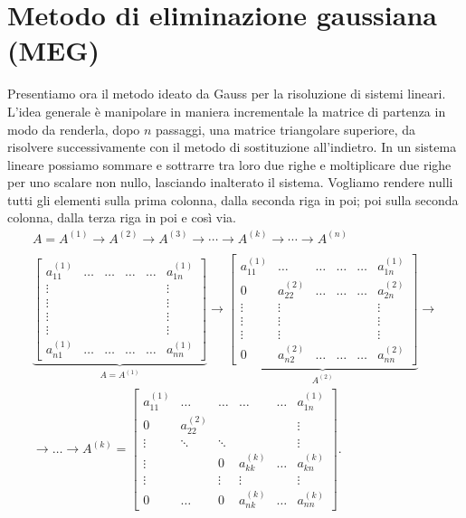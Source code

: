 \section{Metodo di eliminazione gaussiana (MEG)}
Presentiamo ora il metodo ideato da Gauss per la risoluzione di sistemi lineari.
L'idea generale è manipolare in maniera incrementale la matrice di partenza in modo da renderla, dopo $\displaystyle n$ passaggi, una matrice triangolare superiore, da risolvere successivamente con il metodo di sostituzione all'indietro. In un sistema lineare possiamo sommare e sottrarre tra loro due righe e moltiplicare due righe per uno scalare non nullo, lasciando inalterato il sistema. Vogliamo rendere nulli tutti gli elementi sulla prima colonna, dalla seconda riga in poi; poi sulla seconda colonna, dalla terza riga in poi e così via.
\begin{gather*}
A=A^{(1)}\rightarrow A^{(2)}\rightarrow A^{(3)}\rightarrow \cdots \rightarrow A^{(k)}\rightarrow \cdots \rightarrow A^{(n)}\\
\\
\underbrace{\begin{bmatrix}
a^{(1)}_{11} & \dotsc  & \dotsc  & \dotsc  & \dotsc  & a^{(1)}_{1n}\\
\vdots  &  &  &  &  & \vdots \\
\vdots  &  &  &  &  & \vdots \\
\vdots  &  &  &  &  & \vdots \\
\vdots  &  &  &  &  & \vdots \\
a^{(1)}_{n1} & \dotsc  & \dotsc  & \dotsc  & \dotsc  & a^{(1)}_{nn}
\end{bmatrix}}_{A=A^{(1)}}\rightarrow \underbrace{\begin{bmatrix}
a^{(1)}_{11} & \dotsc  & \dotsc  & \dotsc  & \dotsc  & a^{(1)}_{1n}\\
0 & a^{(2)}_{22} & \dotsc  & \dotsc  & \dotsc  & a^{(2)}_{2n}\\
\vdots  & \vdots  &  &  &  & \vdots \\
\vdots  & \vdots  &  &  &  & \vdots \\
\vdots  & \vdots  &  &  &  & \vdots \\
0 & a^{(2)}_{n2} & \dotsc  & \dotsc  & \dotsc  & a^{(2)}_{nn}
\end{bmatrix}}_{A^{(2)}}\rightarrow \\
\rightarrow \dotsc \rightarrow A^{(k)} =\begin{bmatrix}
a^{(1)}_{11} & \dotsc  & \dotsc  & \dotsc  & \dotsc  & a^{(1)}_{1n}\\
0 & a^{(2)}_{22} &  &  &  & \vdots \\
\vdots  & \ddots  & \ddots  &  &  & \vdots \\
\vdots  &  & 0 & a^{(k)}_{kk} & \dotsc  & a^{(k)}_{kn}\\
\vdots  &  & \vdots  & \vdots  &  & \vdots \\
0 & \dotsc  & 0 & a^{(k)}_{nk} & \dotsc  & a^{(k)}_{nn}
\end{bmatrix}.
\end{gather*}
